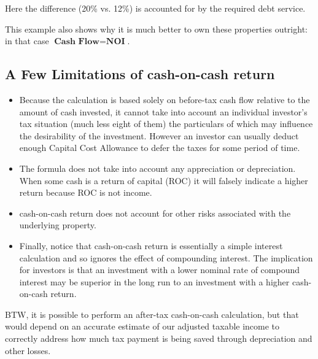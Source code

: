\documentclass[11pt, oneside]{article}   	%
\theoremstyle{definition}
\begin{document}
\bigskip
\noindent
Here the difference (20\% vs. 12\%) is accounted for by the required debt service. 

\bigskip
\noindent
This example also shows why it is much better to own these properties outright:
in that case $\textbf{Cash Flow}  \boldsymbol{=}  \textbf{NOI}$.

\subsection{A Few Limitations of cash-on-cash return}

\begin{itemize}
\item Because the calculation is based solely on before-tax cash flow relative to the amount of cash invested, it cannot take into account an individual investor's tax situation (much less eight of them) the particulars of which may influence the desirability of the investment. However an investor can usually deduct enough Capital Cost Allowance to defer the taxes for some period of time.

\item The formula does not take into account any appreciation or depreciation. When some cash is a return of capital (ROC) it will falsely indicate a higher return because ROC is not income.

\item cash-on-cash return does not account for other risks associated with the underlying property.

\item Finally, notice that cash-on-cash return is essentially a simple interest calculation and so ignores the effect of compounding interest. The implication for investors is that an 
investment with a lower nominal rate of compound interest may be superior in the long run to an investment with a higher cash-on-cash return.
\end{itemize}

\bigskip
\noindent
BTW, it is possible to perform an after-tax cash-on-cash calculation, but that would depend on an accurate estimate of our adjusted taxable income to correctly address how much tax payment is being saved through depreciation and other losses.




\end{document}
